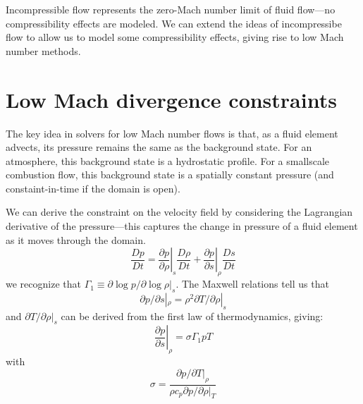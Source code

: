 \newcommand{\teta}{\tilde{\eta}}

Incompressible flow represents the zero-Mach number limit of fluid
flow---no compressibility effects are modeled.  We can extend the
ideas of incompressibe flow to allow us to model some compressibility
effects, giving rise to low Mach number methods.

\section{Low Mach divergence constraints}

The key idea in solvers for low Mach number flows is that, as a fluid
element advects, its pressure remains the same as the background
state.  For an atmosphere, this background state is a hydrostatic
profile.  For a smallscale combustion flow, this background state is a
spatially constant pressure (and constaint-in-time if the domain is
open).

We can derive the constraint on the velocity field by considering the
Lagrangian derivative of the pressure---this captures the change in
pressure of a fluid element as it moves through the domain.
\begin{equation}
\frac{Dp}{Dt} = \left . \frac{\partial p}{\partial \rho} \right |_s
     \frac{D\rho}{Dt} +
     \left . \frac{\partial p}{\partial s} \right |_\rho
     \frac{Ds}{Dt}
\end{equation}
we recognize that $\Gamma_1 \equiv \partial \log p/\partial \log \rho |_s$.
The Maxwell relations tell us that
\begin{equation}
\partial p/\partial s |_\rho = \rho^2 \partial T/\partial \rho |_s
\end{equation}
and $\partial T/\partial \rho |_s$ can be derived from the first law
of thermodynamics, giving:
\begin{equation}
\left . \frac{\partial p}{\partial s} \right |_\rho 
= \sigma \Gamma_1 p T
\end{equation}
with 
\begin{equation}
\sigma = \frac{\partial p/\partial T |_\rho}{\rho c_p \partial p/\partial \rho |_T}
\end{equation}

